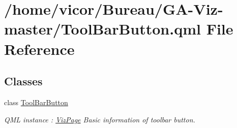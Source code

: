 \hypertarget{_tool_bar_button_8qml}{}\section{/home/vicor/\+Bureau/\+G\+A-\/\+Viz-\/master/\+Tool\+Bar\+Button.qml File Reference}
\label{_tool_bar_button_8qml}
\subsection*{Classes}
\begin{DoxyCompactItemize}
\item 
class \hyperlink{class_tool_bar_button}{Tool\+Bar\+Button}
\begin{DoxyCompactList}\small\item\em Q\+ML instance \+: \hyperlink{class_viz_page}{Viz\+Page} Basic information of toolbar button. \end{DoxyCompactList}\end{DoxyCompactItemize}
